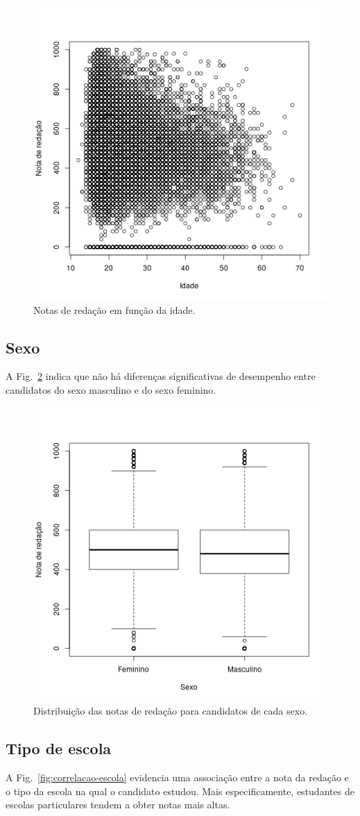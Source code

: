 \documentclass[12pt]{article}
\newcommand{\reffig}[1]{Fig.~\ref{fig:#1}}
\begin{document}
\begin{figure}[H]
\centering\includegraphics[width=.6\linewidth]{../correlacao_idade.png}
\caption{Notas de redação em função da idade.}
\label{fig:correlacao-idade}
\end{figure}

\subsection{Sexo}
A \reffig{correlacao-sexo} indica que não há diferenças significativas de desempenho entre candidatos do sexo masculino e do sexo feminino.

\begin{figure}[H]
\centering\includegraphics[width=.6\linewidth]{../correlacao_sexo.png}
\caption{Distribuição das notas de redação para candidatos de cada sexo.}
\label{fig:correlacao-sexo}
\end{figure}

\subsection{Tipo de escola}
A \reffig{correlacao-escola} evidencia uma associação entre a nota da redação e o tipo da escola na qual o candidato estudou.
Mais especificamente, estudantes de escolas particulares tendem a obter notas mais altas.
\end{document}
